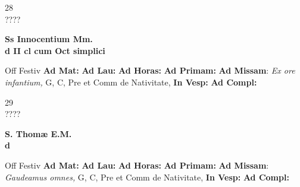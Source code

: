 \documentclass[10pt, openany]{book}
\begin{document}
    \begin{center}
        \begin{minipage}{3.5in}
            \vspace{2em}
            \begin{minipage}{0.5in}
                {\Huge 28} \\
                {\normalsize ????}
            \end{minipage}
            \begin{minipage}{3.0in}
                \textbf{ \large Ss Innocentium Mm. \\
                \textnormal{\normalsize d II cl cum Oct simplici}}

            \end{minipage}
            \begin{justify}Off Festiv
                \textbf{Ad Mat: }
                \textbf{Ad Lau: }
                \textbf{Ad Horas: }
                \textbf{Ad Primam: }\textbf{Ad Missam}: \textit{Ex ore infantium,} G, C, Pre et Comm de Nativitate, 
                \textbf{In Vesp: }
                \textbf{Ad Compl: }
            \end{justify}
        \end{minipage}
    \end{center}

    \begin{center}
        \begin{minipage}{3.5in}
            \vspace{2em}
            \begin{minipage}{0.5in}
                {\Huge 29} \\
                {\normalsize ????}
            \end{minipage}
            \begin{minipage}{3.0in}
                \textbf{ \large S. Thomæ E.M. \\
                \textnormal{\normalsize d}}

            \end{minipage}
            \begin{justify}Off Festiv
                \textbf{Ad Mat: }
                \textbf{Ad Lau: }
                \textbf{Ad Horas: }
                \textbf{Ad Primam: }\textbf{Ad Missam}: \textit{Gaudeamus omnes,} G, C, Pre et Comm de Nativitate, 
                \textbf{In Vesp: }
                \textbf{Ad Compl: }
            \end{justify}
        \end{minipage}
    \end{center}
\end{document}
